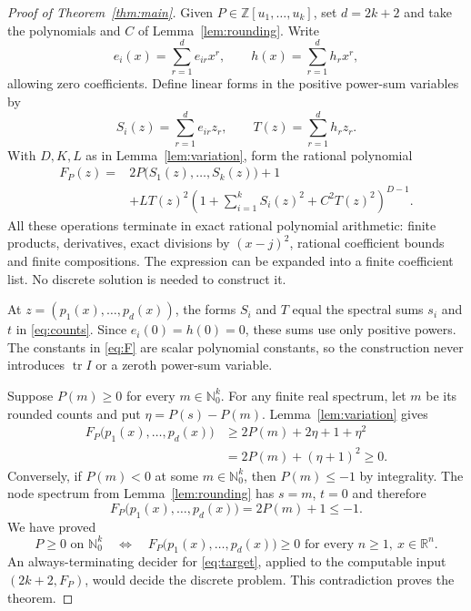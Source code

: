 \documentclass[11pt]{article}
\newcommand{\tr}{\operatorname{tr}}
\newcommand{\Nzero}{\mathbb{N}_0}
\begin{document}
\begin{proof}[Proof of Theorem~\ref{thm:main}]
Given $P\in\mathbb{Z}[u_1,\ldots,u_k]$, set $d=2k+2$ and take the
polynomials and $C$ of Lemma~\ref{lem:rounding}. Write
\[
 e_i(x)=\sum_{r=1}^d e_{ir}x^r,\qquad
 h(x)=\sum_{r=1}^d h_r x^r,
\]
allowing zero coefficients. Define linear forms in the positive power-sum
variables by
\[
 S_i(z)=\sum_{r=1}^d e_{ir}z_r,\qquad
 T(z)=\sum_{r=1}^d h_r z_r.
\]
With $D,K,L$ as in Lemma~\ref{lem:variation}, form the rational polynomial
\begin{equation}\label{eq:F}
 \begin{split}
 F_P(z)={}&2P\bigl(S_1(z),\ldots,S_k(z)\bigr)+1\\
 &+L T(z)^2\left(1+\sum_{i=1}^k S_i(z)^2+C^2T(z)^2\right)^{D-1}.
 \end{split}
\end{equation}
All these operations terminate in exact rational polynomial arithmetic:
finite products, derivatives, exact divisions by $(x-j)^2$, rational
coefficient bounds and finite compositions. The expression can be expanded
into a finite coefficient list. No discrete solution is needed to construct
it.

At $z=(p_1(x),\ldots,p_d(x))$, the forms $S_i$ and $T$ equal the spectral
sums $s_i$ and $t$ in \eqref{eq:counts}. Since $e_i(0)=h(0)=0$, these sums
use only positive powers. The constants in \eqref{eq:F} are scalar
polynomial constants, so the construction never introduces $\tr I$ or a
zeroth power-sum variable.

Suppose $P(m)\geq0$ for every $m\in\Nzero^k$. For any finite real spectrum,
let $m$ be its rounded counts and put $\eta=P(s)-P(m)$. Lemma~\ref{lem:variation}
gives
\[
 \begin{split}
 F_P\bigl(p_1(x),\ldots,p_d(x)\bigr)
 &\geq 2P(m)+2\eta+1+\eta^2\\
 &=2P(m)+(\eta+1)^2\geq0.
 \end{split}
\]
Conversely, if $P(m)<0$ at some $m\in\Nzero^k$, then $P(m)\leq-1$ by
integrality. The node spectrum from Lemma~\ref{lem:rounding} has $s=m$,
$t=0$ and therefore
\[
 F_P\bigl(p_1(x),\ldots,p_d(x)\bigr)=2P(m)+1\leq-1.
\]
We have proved
\[
 P\geq0\text{ on }\Nzero^k
 \quad\Longleftrightarrow\quad
 F_P\bigl(p_1(x),\ldots,p_d(x)\bigr)\geq0
 \text{ for every }n\geq1,\ x\in\mathbb{R}^n.
\]
An always-terminating decider for \eqref{eq:target}, applied to the computable
input $(2k+2,F_P)$, would decide the discrete problem. This contradiction
proves the theorem.
\end{proof}
\end{document}

